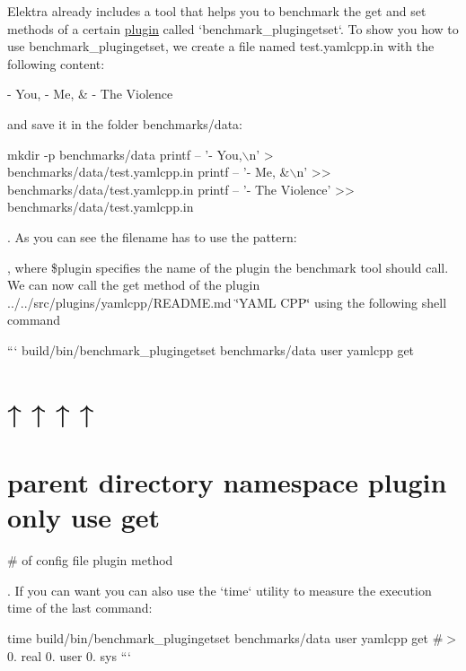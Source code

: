 Elektra already includes a tool that helps you to benchmark the {\ttfamily get} and {\ttfamily set} methods of a certain \hyperlink{doc_tutorials_plugins_md}{plugin} called `benchmark\+\_\+plugingetset`. To show you how to use {\ttfamily benchmark\+\_\+plugingetset}, we create a file named {\ttfamily test.\+yamlcpp.\+in} with the following content\+:


\begin{DoxyCode}
- You,
- Me, &
- The Violence
\end{DoxyCode}


and save it in the folder {\ttfamily benchmarks/data}\+:


\begin{DoxyCode}
mkdir -p benchmarks/data
printf -- '- You,\(\backslash\)n'       >  benchmarks/data/test.yamlcpp.in
printf -- '- Me, &\(\backslash\)n'      >> benchmarks/data/test.yamlcpp.in
printf -- '- The Violence' >> benchmarks/data/test.yamlcpp.in
\end{DoxyCode}


. As you can see the filename has to use the pattern\+:




, where {\ttfamily \$plugin} specifies the name of the plugin the benchmark tool should call. We can now call the {\ttfamily get} method of the plugin ../../src/plugins/yamlcpp/\+R\+E\+A\+D\+ME.md \char`\"{}\+Y\+A\+M\+L C\+P\+P\char`\"{} using the following shell command

``` build/bin/benchmark\+\_\+plugingetset benchmarks/data user yamlcpp get \section*{↑ ↑ ↑ ↑}

\section*{parent directory namespace plugin only use {\ttfamily get}}

\# of config file plugin method 
\begin{DoxyCode}
. If you can want you can also use the `time` utility to measure the execution time of the last command:
\end{DoxyCode}
 time build/bin/benchmark\+\_\+plugingetset benchmarks/data user yamlcpp get \#$>$ 0. real 0. user 0. sys ```

